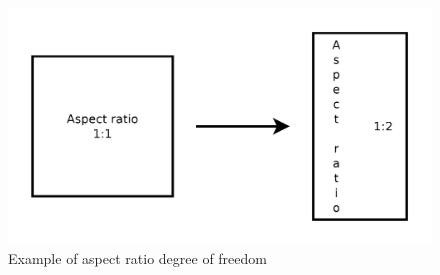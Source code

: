 \begin{figure}[h!]
\begin{center}
\includegraphics[width=\linewidth]{form_factor_ex.pdf}
\end{center}
\vspace{-0.5cm}
\caption{Example of aspect ratio degree of freedom}
\label{fig:ff_ex}
\end{figure}

